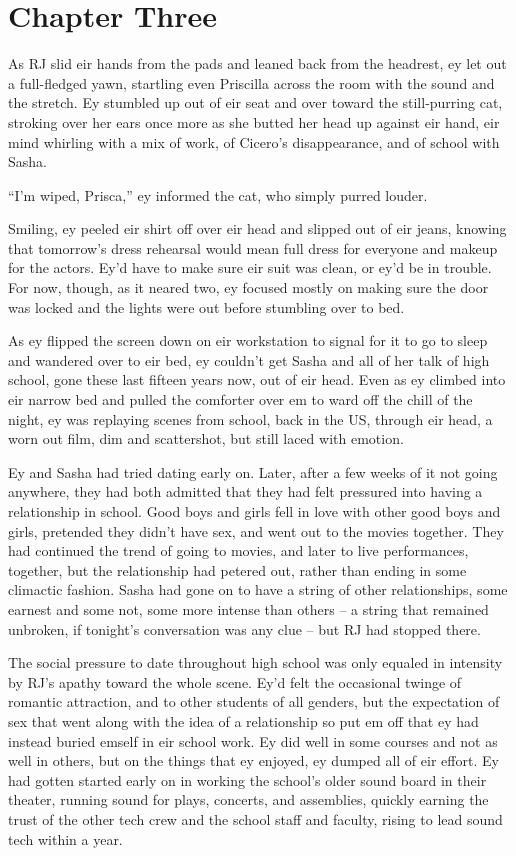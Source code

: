 \chapter*{Chapter Three}

As RJ slid eir hands from the pads and leaned back from the headrest, ey let out a full-fledged yawn, startling even Priscilla across the room with the sound and the stretch. Ey stumbled up out of eir seat and over toward the still-purring cat, stroking over her ears once more as she butted her head up against eir hand, eir mind whirling with a mix of work, of Cicero's disappearance, and of school with Sasha.

``I'm wiped, Prisca,'' ey informed the cat, who simply purred louder.

Smiling, ey peeled eir shirt off over eir head and slipped out of eir jeans, knowing that tomorrow's dress rehearsal would mean full dress for everyone and makeup for the actors. Ey'd have to make sure eir suit was clean, or ey'd be in trouble. For now, though, as it neared two, ey focused mostly on making sure the door was locked and the lights were out before stumbling over to bed.

As ey flipped the screen down on eir workstation to signal for it to go to sleep and wandered over to eir bed, ey couldn't get Sasha and all of her talk of high school, gone these last fifteen years now, out of eir head. Even as ey climbed into eir narrow bed and pulled the comforter over em to ward off the chill of the night, ey was replaying scenes from school, back in the US, through eir head, a worn out film, dim and scattershot, but still laced with emotion.

Ey and Sasha had tried dating early on. Later, after a few weeks of it not going anywhere, they had both admitted that they had felt pressured into having a relationship in school. Good boys and girls fell in love with other good boys and girls, pretended they didn't have sex, and went out to the movies together. They had continued the trend of going to movies, and later to live performances, together, but the relationship had petered out, rather than ending in some climactic fashion. Sasha had gone on to have a string of other relationships, some earnest and some not, some more intense than others -- a string that remained unbroken, if tonight's conversation was any clue -- but RJ had stopped there.

The social pressure to date throughout high school was only equaled in intensity by RJ's apathy toward the whole scene. Ey'd felt the occasional twinge of romantic attraction, and to other students of all genders, but the expectation of sex that went along with the idea of a relationship so put em off that ey had instead buried emself in eir school work. Ey did well in some courses and not as well in others, but on the things that ey enjoyed, ey dumped all of eir effort. Ey had gotten started early on in working the school's older sound board in their theater, running sound for plays, concerts, and assemblies, quickly earning the trust of the other tech crew and the school staff and faculty, rising to lead sound tech within a year.

